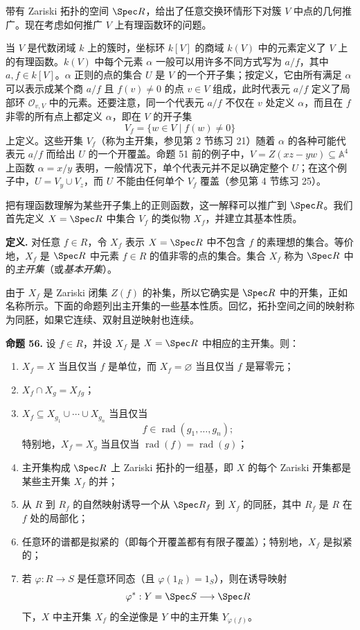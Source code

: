带有 Zariski 拓扑的空间 $\Spec R$，给出了任意交换环情形下对簇 $V$ 中点的几何推广。现在考虑如何推广 $V$ 上有理函数环的问题。

当 $V$ 是代数闭域 $k$ 上的簇时，坐标环 $k[V]$ 的商域 $k(V)$ 中的元素定义了 $V$ 上的有理函数。$k(V)$ 中每个元素 $\alpha$ 一般可以用许多不同方式写为 $a/f$，其中 $a,f\in k[V]$。$\alpha$ 正则的点的集合 $U$ 是 $V$ 的一个开子集；按定义，它由所有满足 $\alpha$ 可以表示成某个商 $a/f$ 且 $f(v)\ne0$ 的点 $v\in V$ 组成，此时代表元 $a/f$ 定义了局部环 $\mathcal O_{v,V}$ 中的元素。还要注意，同一个代表元 $a/f$ 不仅在 $v$ 处定义 $\alpha$，而且在 $f$ 非零的所有点上都定义 $\alpha$，即在 $V$ 的开子集
\[
V_f=\{w\in V\mid f(w)\ne0\}
\]
上定义。这些开集 $V_f$（称为主开集，参见第 2 节练习 21）随着 $\alpha$ 的各种可能代表元 $a/f$ 而给出 $U$ 的一个开覆盖。命题 51 前的例子中，$V=Z(xz-yw)\subseteq\mathbb A^4$ 上函数 $\alpha=x/y$ 表明，一般情况下，单个代表元并不足以确定整个 $U$；在这个例子中，$U=V_y\cup V_z$，而 $U$ 不能由任何单个 $V_f$ 覆盖（参见第 4 节练习 25）。

把有理函数理解为某些开子集上的正则函数，这一解释可以推广到 $\Spec R$。我们首先定义 $X=\Spec R$ 中集合 $V_f$ 的类似物 $X_f$，并建立其基本性质。

\noindent\textbf{定义.} 对任意 $f\in R$，令 $X_f$ 表示 $X=\Spec R$ 中不包含 $f$ 的素理想的集合。等价地，$X_f$ 是 $\Spec R$ 中元素 $f\in R$ 的值非零的点的集合。集合 $X_f$ 称为 $\Spec R$ 中的\emph{主开集}（或\emph{基本开集}）。

由于 $X_f$ 是 Zariski 闭集 $Z(f)$ 的补集，所以它确实是 $\Spec R$ 中的开集，正如名称所示。下面的命题列出主开集的一些基本性质。回忆，拓扑空间之间的映射称为同胚，如果它连续、双射且逆映射也连续。

\noindent\textbf{命题 56.} 设 $f\in R$，并设 $X_f$ 是 $X=\Spec R$ 中相应的主开集。则：
\begin{enumerate}[label=(\arabic*)]
	\item $X_f=X$ 当且仅当 $f$ 是单位，而 $X_f=\varnothing$ 当且仅当 $f$ 是幂零元；
	\item $X_f\cap X_g=X_{fg}$；
	\item $X_f\subseteq X_{g_1}\cup\cdots\cup X_{g_n}$ 当且仅当
	\[
	f\in\operatorname{rad}(g_1,\ldots,g_n);
	\]
	特别地，$X_f=X_g$ 当且仅当 $\operatorname{rad}(f)=\operatorname{rad}(g)$；
	\item 主开集构成 $\Spec R$ 上 Zariski 拓扑的一组基，即 $X$ 的每个 Zariski 开集都是某些主开集 $X_f$ 的并；
	\item 从 $R$ 到 $R_f$ 的自然映射诱导一个从 $\Spec R_f$ 到 $X_f$ 的同胚，其中 $R_f$ 是 $R$ 在 $f$ 处的局部化；
	\item 任意环的谱都是拟紧的（即每个开覆盖都有有限子覆盖）；特别地，$X_f$ 是拟紧的；
	\item 若 $\varphi:R\to S$ 是任意环同态（且 $\varphi(1_R)=1_S$），则在诱导映射
	\[
	\varphi^*:Y=\Spec S\longrightarrow\Spec R
	\]
	下，$X$ 中主开集 $X_f$ 的全逆像是 $Y$ 中的主开集 $Y_{\varphi(f)}$。
\end{enumerate}

